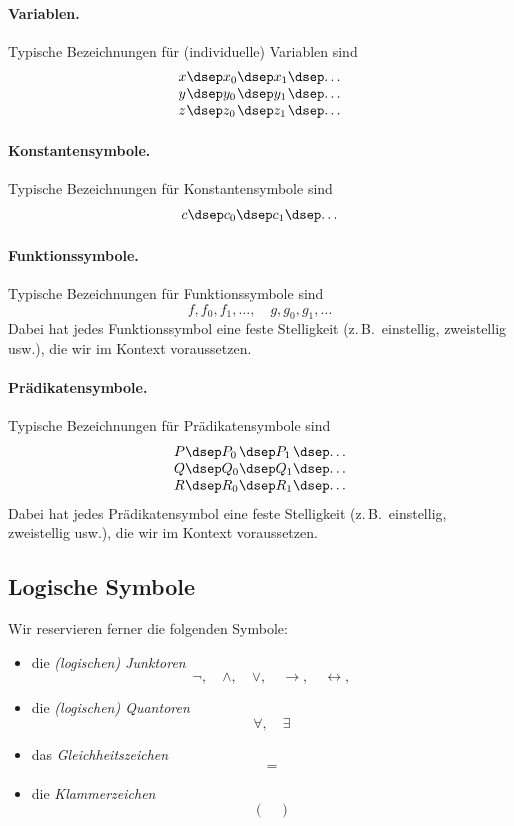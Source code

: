 \documentclass[main.tex]{subfiles}
\begin{document}
\paragraph{Variablen.}
Typische Bezeichnungen für (individuelle) Variablen sind
\[
\begin{array}{l@{\dsep}l@{\dsep}l@{\dsep}l}
  x & x_0 & x_1 & \dots \\
  y & y_0 & y_1 & \dots \\
  z & z_0 & z_1 & \dots
\end{array}
\]

\paragraph{Konstantensymbole.}
Typische Bezeichnungen für Konstantensymbole sind
\[
\begin{array}{l@{\dsep}l@{\dsep}l@{\dsep}l}
  c & c_0 & c_1 & \dots
\end{array}
\]

\paragraph{Funktionssymbole.}
Typische Bezeichnungen für Funktionssymbole sind
\[
  f, f_0, f_1, \dots,\quad g, g_0, g_1, \dots
\]
Dabei hat jedes Funktionssymbol eine feste Stelligkeit (z.\,B.\ 
einstellig, zweistellig usw.), die wir im Kontext voraussetzen.


\paragraph{Prädikatensymbole.}
Typische Bezeichnungen für Prädikatensymbole sind
\[
\begin{array}{l@{\dsep}l@{\dsep}l@{\dsep}l}
  P & P_0 & P_1 & \dots \\
  Q & Q_0 & Q_1 & \dots \\
  R & R_0 & R_1 & \dots
\end{array}
\]
Dabei hat jedes Prädikatensymbol eine feste Stelligkeit (z.\,B.\ 
einstellig, zweistellig usw.), die wir im Kontext voraussetzen.

\subsection{Logische Symbole}

Wir reservieren ferner die folgenden Symbole:
\begin{itemize}
  \item die \emph{(logischen) Junktoren}
    \[
      \neg,\quad \land,\quad \lor,\quad \rightarrow,\quad \leftrightarrow,
    \]
  \item die \emph{(logischen) Quantoren}
    \[
      \forall,\quad \exists
    \]
  \item das \emph{Gleichheitszeichen}
    \[
      =
    \]
  \item die \emph{Klammerzeichen}
    \[
      ( \quad )
    \]
\end{itemize}
\end{document}
